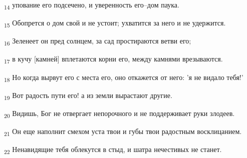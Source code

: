 \begin{tcolorbox}
\textsubscript{14} упование его подсечено, и уверенность его--дом паука.
\end{tcolorbox}
\begin{tcolorbox}
\textsubscript{15} Обопрется о дом свой и не устоит; ухватится за него и не удержится.
\end{tcolorbox}
\begin{tcolorbox}
\textsubscript{16} Зеленеет он пред солнцем, за сад простираются ветви его;
\end{tcolorbox}
\begin{tcolorbox}
\textsubscript{17} в кучу [камней] вплетаются корни его, между камнями врезываются.
\end{tcolorbox}
\begin{tcolorbox}
\textsubscript{18} Но когда вырвут его с места его, оно откажется от него: 'я не видало тебя!'
\end{tcolorbox}
\begin{tcolorbox}
\textsubscript{19} Вот радость пути его! а из земли вырастают другие.
\end{tcolorbox}
\begin{tcolorbox}
\textsubscript{20} Видишь, Бог не отвергает непорочного и не поддерживает руки злодеев.
\end{tcolorbox}
\begin{tcolorbox}
\textsubscript{21} Он еще наполнит смехом уста твои и губы твои радостным восклицанием.
\end{tcolorbox}
\begin{tcolorbox}
\textsubscript{22} Ненавидящие тебя облекутся в стыд, и шатра нечестивых не станет.
\end{tcolorbox}

